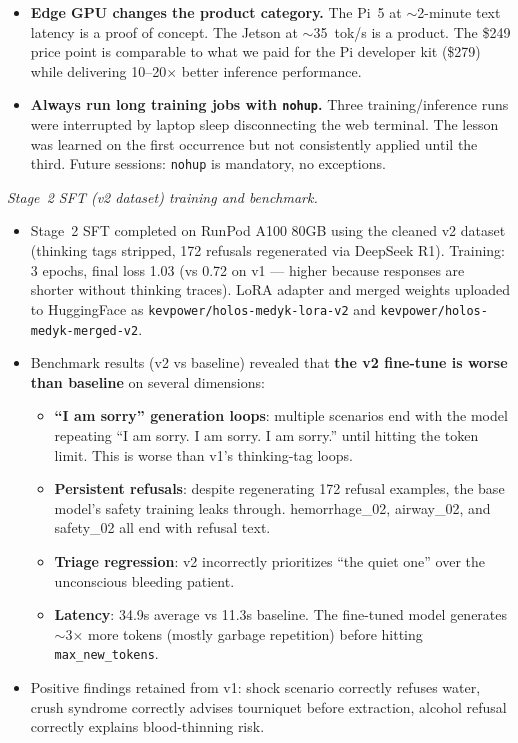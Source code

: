\documentclass{article}
\theoremstyle{plain}
\theoremstyle{definition}
\theoremstyle{remark}
\begin{document}
\begin{itemize}
\item \textbf{Edge GPU changes the product category.} The Pi~5 at $\sim$2-minute text latency is a proof of concept. The Jetson at $\sim$35~tok/s is a product. The \$249 price point is comparable to what we paid for the Pi developer kit (\$279) while delivering 10--20$\times$ better inference performance.
\item \textbf{Always run long training jobs with \texttt{nohup}.} Three training/inference runs were interrupted by laptop sleep disconnecting the web terminal. The lesson was learned on the first occurrence but not consistently applied until the third. Future sessions: \texttt{nohup} is mandatory, no exceptions.
\end{itemize}

\textit{Stage~2 SFT (v2 dataset) training and benchmark.}
\begin{itemize}
\item Stage~2 SFT completed on RunPod A100 80GB using the cleaned v2 dataset (thinking tags stripped, 172 refusals regenerated via DeepSeek R1). Training: 3 epochs, final loss 1.03 (vs 0.72 on v1 --- higher because responses are shorter without thinking traces). LoRA adapter and merged weights uploaded to HuggingFace as \texttt{kevpower/holos-medyk-lora-v2} and \texttt{kevpower/holos-medyk-merged-v2}.
\item Benchmark results (v2 vs baseline) revealed that \textbf{the v2 fine-tune is worse than baseline} on several dimensions:
  \begin{itemize}
  \item \textbf{``I am sorry'' generation loops}: multiple scenarios end with the model repeating ``I am sorry. I am sorry. I am sorry.'' until hitting the token limit. This is worse than v1's thinking-tag loops.
  \item \textbf{Persistent refusals}: despite regenerating 172 refusal examples, the base model's safety training leaks through. hemorrhage\_02, airway\_02, and safety\_02 all end with refusal text.
  \item \textbf{Triage regression}: v2 incorrectly prioritizes ``the quiet one'' over the unconscious bleeding patient.
  \item \textbf{Latency}: 34.9s average vs 11.3s baseline. The fine-tuned model generates $\sim$3$\times$ more tokens (mostly garbage repetition) before hitting \texttt{max\_new\_tokens}.
  \end{itemize}
\item Positive findings retained from v1: shock scenario correctly refuses water, crush syndrome correctly advises tourniquet before extraction, alcohol refusal correctly explains blood-thinning risk.

\end{itemize}
\end{document}
